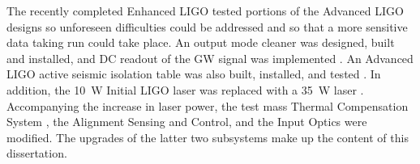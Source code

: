 The recently completed Enhanced LIGO tested portions of the Advanced
LIGO designs so unforeseen difficulties could be addressed and so that
a more sensitive data taking run could take place. An output mode
cleaner was designed, built and installed, and DC readout of the GW
signal was implemented \cite{Fricke2011DC}. An Advanced LIGO active
seismic isolation table was also built, installed, and tested
\cite{KisselThesis}. In addition, the 10~W Initial LIGO laser was
replaced with a 35~W laser \cite{Frede2007Fundamental}. Accompanying
the increase in laser power, the test mass Thermal Compensation System
\citep{Willems2009Thermal}, the Alignment Sensing and Control, and the
Input Optics were modified. The upgrades of the latter two subsystems
make up the content of this dissertation.








